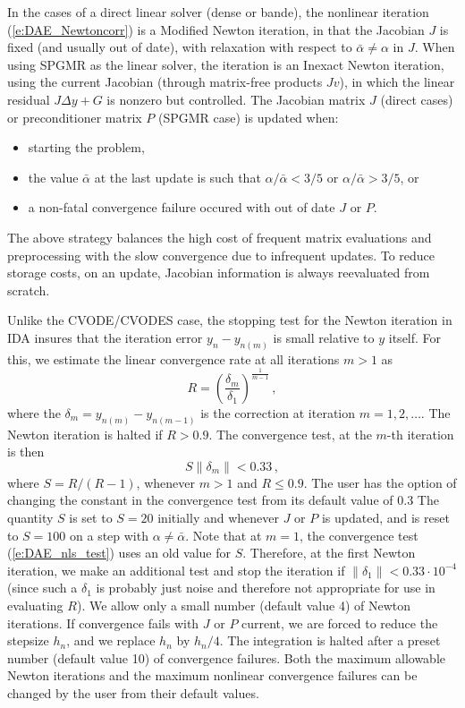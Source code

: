 In the cases of a direct linear solver (dense or bande), the nonlinear 
iteration (\ref{e:DAE_Newtoncorr}) is a Modified Newton iteration, in
that the Jacobian $J$ is fixed (and usually out of date), with
relaxation with respect to $\bar\alpha \neq \alpha$ in $J$. When using
SPGMR as the linear solver, the iteration is an Inexact Newton iteration,
using the current Jacobian (through matrix-free products $Jv$), in 
which the linear residual $J\Delta y + G$ is nonzero but controlled.
The Jacobian matrix $J$ (direct cases) or preconditioner matrix $P$ 
(SPGMR case) is updated when:
\begin{itemize}
\item starting the problem,
\item the value $\bar\alpha$ at the last update is such that
  $\alpha / {\bar\alpha} < 3/5$ or $\alpha / {\bar\alpha} > 3/5$, or
\item a non-fatal convergence failure occured with out of date $J$ or $P$.
\end{itemize}
The above strategy balances the high cost of frequent matrix evaluations
and preprocessing with the slow convergence due to infrequent updates.
To reduce storage costs, on an update, Jacobian information is always
reevaluated from scratch.

Unlike the CVODE/CVODES case, the stopping test for the Newton iteration
in IDA insures that the iteration error $y_n - y_{n(m)}$ is small relative
to $y$ itself. For this, we estimate the linear convergence rate at all 
iterations $m>1$ as
\begin{equation*}
R = \left( \frac{\delta_m}{\delta_1} \right)^{\frac{1}{m-1}} \, , 
\end{equation*}
where the $\delta_m = y_{n(m)} - y_{n(m-1)}$ is the correction at
iteration $m=1,2,\ldots$. The Newton iteration is halted if $R>0.9$.
The convergence test, at the $m$-th iteration is then
\begin{equation}\label{e:DAE_nls_test}
S \| \delta_m \| < 0.33 \, ,
\end{equation}
where $S = R/(R-1)$, whenever $m>1$ and $R\le 0.9$. The user has the
option of changing the constant in the convergence test from its default 
value of $0.3$
%
The quantity $S$ is set to $S=20$ initially and whenever $J$ or $P$ is
updated, and is reset to $S=100$ on a step with $\alpha \neq \bar\alpha$.
Note that at $m=1$, the convergence test (\ref{e:DAE_nls_test}) uses an old 
value for $S$. Therefore, at the first Newton iteration, we make an additional
test and stop the iteration if $\|\delta_1\| < 0.33 \cdot 10^{-4}$
(since such a $\delta_1$ is probably just noise and therefore not appropriate 
for use in evaluating $R$).
%
We allow only a small number (default value 4) of Newton iterations.
If convergence fails with $J$ or $P$ current, 
we are forced to reduce the stepsize $h_n$, and we replace $h_n$ by $h_n/4$.
The integration is halted after a preset number (default value 10)
of convergence failures. Both the maximum allowable Newton iterations
and the maximum nonlinear convergence failures can be changed by the user
from their default values.

